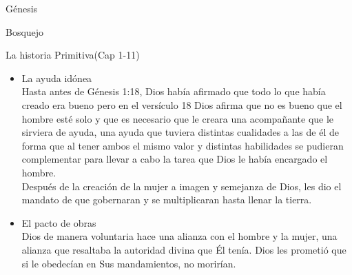 \begin{section}{Génesis}
\begin{subsection}{Bosquejo}
\begin{subsubsection}{La historia Primitiva(Cap 1-11)}
\begin{enumerate}
\begin{itemize}
\begin{itemize}
En su estado de inocencia el hombre iba a ser inmortal, su cuerpo estaba preparado para ello pero el pecado trajo la muerte (separación).\\
Dios tenía propósitos bien definidos para la cúspide de la creación, se le dió dominio sobre toda la naturaleza. Todo estaba a su gobierno para que Dios fuera glorificado. Dios creó al hombre de esa manera con el propósito de que el hombre le diera la gloria a Él.\\
En el paraíso no había fenómenos naturales, enfermedades, ni animales que le mataran. Existía un clima perfecto y una armonía completa aprovechando las bendiciones de Dios. Además de todos los recursos de los cuales disponía el hombre, Dios le dio una ocupación pues no era bueno que el hombre tuviera tiempo de ocio.
\item La ayuda idónea\\
	Hasta antes de Génesis 1:18, Dios había afirmado que todo lo que había creado era bueno pero en el versículo 18 Dios afirma que no es bueno que el hombre esté solo y que es necesario que le creara una acompañante que le sirviera de ayuda, una ayuda que tuviera distintas cualidades a las de él de forma que al tener ambos el mismo valor y distintas habilidades se pudieran complementar para llevar a cabo la tarea que Dios le había encargado el hombre.\\
	Después de la creación de la mujer a imagen y semejanza de Dios, les dio el mandato de que gobernaran y se multiplicaran hasta llenar la tierra. 
\item El pacto de obras\\
	Dios de manera voluntaria hace una alianza con el hombre y la mujer, una alianza que resaltaba la autoridad divina que Él tenía. Dios les prometió que si le obedecían en Sus mandamientos, no morirían.
\end{itemize}

\end{itemize}
\newpage


\end{enumerate}
\end{subsubsection}
\end{subsection}
\end{section}
